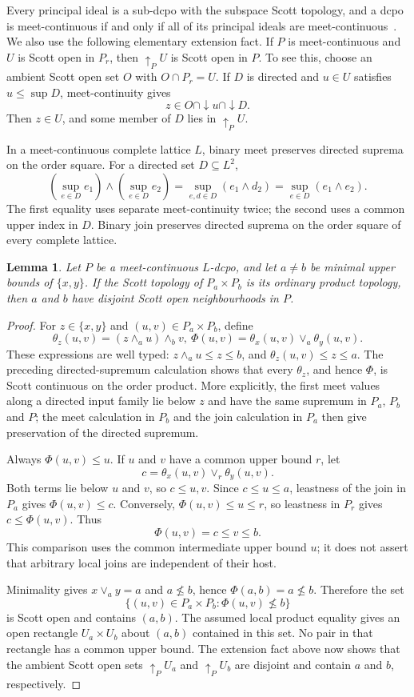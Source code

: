 \documentclass[fleqn,preprint,3p,a4paper]{elsarticle}
\newtheorem{lemma}[theorem]{Lemma}
\theoremstyle{definition}
\begin{document}
Every principal ideal is a sub-dcpo with the subspace Scott topology, and a dcpo is meet-continuous if and only if all of its principal ideals are meet-continuous~\cite[Lemma~3.2]{Xu}. We also use the following elementary extension fact. If $P$ is meet-continuous and $U$ is Scott open in $P_r$, then ${\uparrow}_P U$ is Scott open in $P$. To see this, choose an ambient Scott open set $O$ with $O\cap P_r=U$. If $D$ is directed and $u\in U$ satisfies $u\leq\sup D$, meet-continuity gives
\[
 z\in O\cap{\downarrow} u\cap{\downarrow}D.
\]
Then $z\in U$, and some member of $D$ lies in ${\uparrow}_P U$.

In a meet-continuous complete lattice $L$, binary meet preserves directed suprema on the order square. For a directed set $D\subseteq L^2$,
\[
 \left(\sup_{e\in D}e_1\right)\wedge
 \left(\sup_{e\in D}e_2\right)
 =\sup_{e,d\in D}(e_1\wedge d_2)
 =\sup_{e\in D}(e_1\wedge e_2).
\]
The first equality uses separate meet-continuity twice; the second uses a common upper index in $D$. Binary join preserves directed suprema on the order square of every complete lattice.

\begin{lemma}\label{local:separate}
Let $P$ be a meet-continuous $L$-dcpo, and let $a\neq b$ be minimal upper bounds of $\{x,y\}$. If the Scott topology of $P_a\times P_b$ is its ordinary product topology, then $a$ and $b$ have disjoint Scott open neighbourhoods in $P$.
\end{lemma}
\begin{proof}
For $z\in\{x,y\}$ and $(u,v)\in P_a\times P_b$, define
\[
 \theta_z(u,v)=(z\wedge_a u)\wedge_b v,
 ~
 \Phi(u,v)=\theta_x(u,v)\vee_a\theta_y(u,v).
\]
These expressions are well typed: $z\wedge_a u\leq z\leq b$, and $\theta_z(u,v)\leq z\leq a$. The preceding directed-supremum calculation shows that every $\theta_z$, and hence $\Phi$, is Scott continuous on the order product. More explicitly, the first meet values along a directed input family lie below $z$ and have the same supremum in $P_a$, $P_b$ and $P$; the meet calculation in $P_b$ and the join calculation in $P_a$ then give preservation of the directed supremum.

Always $\Phi(u,v)\leq u$. If $u$ and $v$ have a common upper bound $r$, let
\[
 c=\theta_x(u,v)\vee_r\theta_y(u,v).
\]
Both terms lie below $u$ and $v$, so $c\leq u,v$. Since $c\leq u\leq a$, leastness of the join in $P_a$ gives $\Phi(u,v)\leq c$. Conversely, $\Phi(u,v)\leq u\leq r$, so leastness in $P_r$ gives $c\leq\Phi(u,v)$. Thus
\[
 \Phi(u,v)=c\leq v\leq b.
\]
This comparison uses the common intermediate upper bound $u$; it does not assert that arbitrary local joins are independent of their host.

Minimality gives $x\vee_a y=a$ and $a\nleq b$, hence $\Phi(a,b)=a\nleq b$. Therefore the set
\[
 \{(u,v)\in P_a\times P_b:\Phi(u,v)\nleq b\}
\]
is Scott open and contains $(a,b)$. The assumed local product equality gives an open rectangle $U_a\times U_b$ about $(a,b)$ contained in this set. No pair in that rectangle has a common upper bound. The extension fact above now shows that the ambient Scott open sets ${\uparrow}_P U_a$ and ${\uparrow}_P U_b$ are disjoint and contain $a$ and $b$, respectively.
\end{proof}
\end{document}
